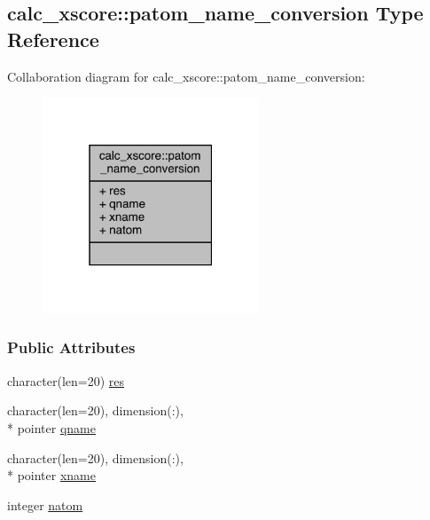 \hypertarget{structcalc__xscore_1_1patom__name__conversion}{\subsection{calc\-\_\-xscore\-:\-:patom\-\_\-name\-\_\-conversion Type Reference}
\label{structcalc__xscore_1_1patom__name__conversion}
}


Collaboration diagram for calc\-\_\-xscore\-:\-:patom\-\_\-name\-\_\-conversion\-:
\nopagebreak
\begin{figure}[H]
\begin{center}
\leavevmode
\includegraphics[width=183pt]{structcalc__xscore_1_1patom__name__conversion__coll__graph}
\end{center}
\end{figure}
\subsubsection*{Public Attributes}
\begin{DoxyCompactItemize}
\item 
character(len=20) \hyperlink{structcalc__xscore_1_1patom__name__conversion_ac2aa06cd2394b1f6383a3ff9179f2411}{res}
\item 
character(len=20), dimension(\-:), \\*
pointer \hyperlink{structcalc__xscore_1_1patom__name__conversion_af0ad5c58744e577cc9f17f6826bb2ca1}{qname}
\item 
character(len=20), dimension(\-:), \\*
pointer \hyperlink{structcalc__xscore_1_1patom__name__conversion_a801f7bda5dea6c76c2892277f7a1385a}{xname}
\item 
integer \hyperlink{structcalc__xscore_1_1patom__name__conversion_a9c49f304081167755513549a8ddea5d8}{natom}
\end{DoxyCompactItemize}


